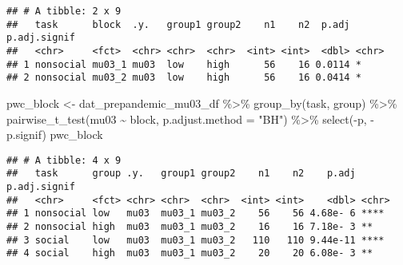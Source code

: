\documentclass[
]{article}
\newenvironment{Shaded}{\begin{snugshade}}{\end{snugshade}}
\newcommand{\AttributeTok}[1]{\textcolor[rgb]{0.77,0.63,0.00}{#1}}
\newcommand{\FunctionTok}[1]{\textcolor[rgb]{0.00,0.00,0.00}{#1}}
\newcommand{\NormalTok}[1]{#1}
\newcommand{\OtherTok}[1]{\textcolor[rgb]{0.56,0.35,0.01}{#1}}
\newcommand{\SpecialCharTok}[1]{\textcolor[rgb]{0.00,0.00,0.00}{#1}}
\newcommand{\StringTok}[1]{\textcolor[rgb]{0.31,0.60,0.02}{#1}}
\begin{document}
\begin{verbatim}
## # A tibble: 2 x 9
##   task      block  .y.   group1 group2    n1    n2  p.adj p.adj.signif
##   <chr>     <fct>  <chr> <chr>  <chr>  <int> <int>  <dbl> <chr>       
## 1 nonsocial mu03_1 mu03  low    high      56    16 0.0114 *           
## 2 nonsocial mu03_2 mu03  low    high      56    16 0.0414 *
\end{verbatim}

\begin{Shaded}
\begin{Highlighting}[]
\NormalTok{pwc\_block }\OtherTok{\textless{}{-}}\NormalTok{ dat\_prepandemic\_mu03\_df }\SpecialCharTok{\%\textgreater{}\%}
  \FunctionTok{group\_by}\NormalTok{(task, group) }\SpecialCharTok{\%\textgreater{}\%}
  \FunctionTok{pairwise\_t\_test}\NormalTok{(mu03 }\SpecialCharTok{\textasciitilde{}}\NormalTok{ block, }\AttributeTok{p.adjust.method =} \StringTok{"BH"}\NormalTok{) }\SpecialCharTok{\%\textgreater{}\%}
  \FunctionTok{select}\NormalTok{(}\SpecialCharTok{{-}}\NormalTok{p, }\SpecialCharTok{{-}}\NormalTok{p.signif)}
\NormalTok{pwc\_block}
\end{Highlighting}
\end{Shaded}

\begin{verbatim}
## # A tibble: 4 x 9
##   task      group .y.   group1 group2    n1    n2    p.adj p.adj.signif
##   <chr>     <fct> <chr> <chr>  <chr>  <int> <int>    <dbl> <chr>       
## 1 nonsocial low   mu03  mu03_1 mu03_2    56    56 4.68e- 6 ****        
## 2 nonsocial high  mu03  mu03_1 mu03_2    16    16 7.18e- 3 **          
## 3 social    low   mu03  mu03_1 mu03_2   110   110 9.44e-11 ****        
## 4 social    high  mu03  mu03_1 mu03_2    20    20 6.08e- 3 **
\end{verbatim}
\end{document}
